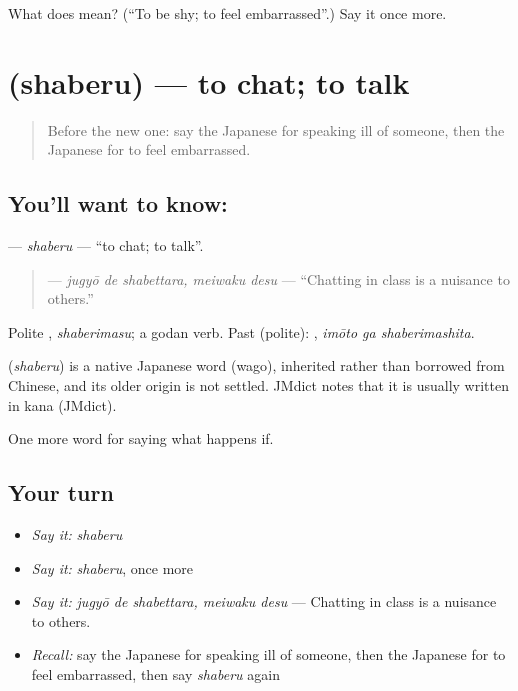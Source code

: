 \begin{tcolorbox}[breakable,colback=teal!4,colframe=teal!35!black,title={Before you move on}]
What does  mean? (\textquotedblleft{}To be shy; to feel embarrassed\textquotedblright{}.) Say it once more.
\end{tcolorbox}
\section[\texorpdfstring{\ja{しゃべる} (shaberu)}{しゃべる (shaberu)}]{ (shaberu) — to chat; to talk}

\label{lesson:JA-C371-shaberu}



\begin{quote}
Before the new one: say the Japanese for speaking ill of someone, then the Japanese for to feel embarrassed.
\end{quote}

\subsection*{You'll want to know: }
\textbf{} — \emph{shaberu} — \textquotedblleft{}to chat; to talk\textquotedblright{}.

\begin{quote}
\textbf{ } — \emph{jugyō de shabettara, meiwaku desu} — \textquotedblleft{}Chatting in class is a nuisance to others.\textquotedblright{}
\end{quote}

Polite \textbf{}, \emph{shaberimasu}; a godan verb. Past (polite): \textbf{ }, \emph{imōto ga shaberimashita}.

\begin{cousinweb}
\textbf{} (\emph{shaberu}) is a native Japanese word (wago), inherited rather than borrowed from Chinese, and its older origin is not settled. JMdict notes that it is usually written in kana (JMdict).
\end{cousinweb}

\begin{grammarlens}[title={What you've built}]
One more word for saying what happens if.
\end{grammarlens}

\subsection*{Your turn}
\begin{itemize}
\raggedright
  \item \emph{Say it:} \emph{shaberu}
  \item \emph{Say it:} \emph{shaberu}, once more
  \item \emph{Say it:} \emph{jugyō de shabettara, meiwaku desu} — Chatting in class is a nuisance to others.
  \item \emph{Recall:} say the Japanese for speaking ill of someone, then the Japanese for to feel embarrassed, then say \emph{shaberu} again
\end{itemize}

